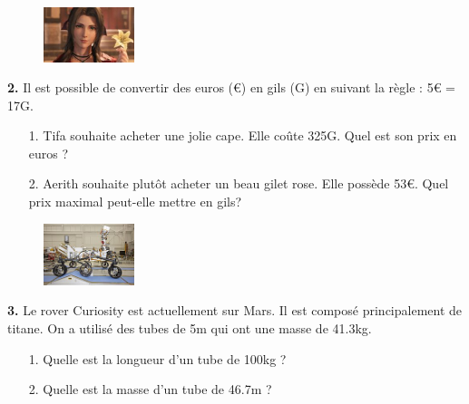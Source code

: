 \Pointilles[6]

\newpage

\begin{minipage}[t]{0.25\textwidth}
  \begin{figure}[H]
    \centering
    \includegraphics[width=100px]{4x2-proportionnalite/ex2.jpg}
  \end{figure}
\end{minipage}
\begin{minipage}[t]{0.75\textwidth}
\textbf{2.} Il est possible de convertir des euros (€) en gils (G) en suivant la règle : 5€ = 17G.

\begin{enumerate}
  \item[1.] Tifa souhaite acheter une jolie cape. Elle coûte 325G. Quel est son prix en euros ? 
  \item[2.] Aerith souhaite plutôt acheter un beau gilet rose. Elle possède 53€. Quel prix maximal peut-elle mettre en gils?
\end{enumerate}

\Pointilles[1]
\end{minipage}

\Pointilles[7]

\begin{minipage}[t]{0.25\textwidth}
  \begin{figure}[H]
    \centering
    \includegraphics[width=100px]{4x2-proportionnalite/ex3.jpg}
  \end{figure}
\end{minipage}
\begin{minipage}[t]{0.75\textwidth}
\textbf{3.} Le rover Curiosity est actuellement sur Mars. Il est composé principalement de titane. On a utilisé des tubes de 5m qui ont une masse de 41.3kg. 

\begin{enumerate}
  \item[1.] Quelle est la longueur d'un tube de 100kg ?
  \item[2.] Quelle est la masse d'un tube de 46.7m ? 
\end{enumerate}

\Pointilles[3]
\end{minipage}


